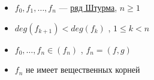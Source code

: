 \SSsect 
\begin{itemize}[label=]
\item \( f_0,f_1,\dots,f_n \) --- \underline{ряд Штурма}, \( n \geqslant 1 \)   
\item \( deg(f_{k+1}) < deg(f_k) \) , \( 1 \leqslant k < n \)  
\item \( f_0,\dots,f_n \in (f_n) \) , \( f_n=(f,g) \)  
\item \( f_n \) не имеет вещественных корней  
\end{itemize}



\vspace

\SSbullet




